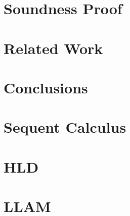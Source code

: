 \documentclass{llncs}
\begin{document}
\section{Soundness Proof}
%

\section{Related Work}


\section{Conclusions}





\appendix
\section{Sequent Calculus}

\section{HLD}


\section{LLAM}

\iffalse
\clearpage
\fi
\end{document}
